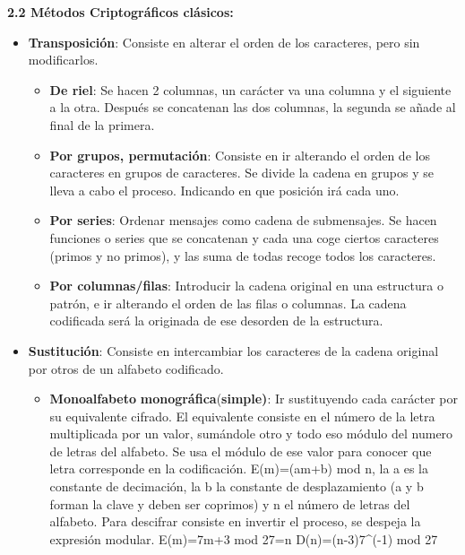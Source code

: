 \documentclass[12pt, twoside, openright]{report} %
\begin{document}
  \pagebreak
  \textbf{2.2 Métodos Criptográficos clásicos:}
  

  \begin{itemize}
  \item \textbf{Transposición}: Consiste en alterar el orden de los
    caracteres, pero sin modificarlos.
    

    \begin{itemize}
    \item \textbf{De riel}: Se hacen 2 columnas, un carácter va una columna
      y el siguiente a la otra. Después se concatenan las dos columnas,
      la segunda se añade al final de la primera.
      
    \item \textbf{Por grupos, permutación}: Consiste en ir alterando el
      orden de los caracteres en grupos de caracteres. Se divide la
      cadena en grupos y se lleva a cabo el proceso. Indicando en que
      posición irá cada uno.
      
    \item \textbf{Por series}: Ordenar mensajes como cadena de submensajes.
      Se hacen funciones o series que se concatenan y cada una coge
      ciertos caracteres (primos y no primos), y las suma de todas
      recoge todos los caracteres.
      
    \item \textbf{Por columnas/filas}: Introducir la cadena original en una
      estructura o patrón, e ir alterando el orden de las filas o
      columnas. La cadena codificada será la originada de ese desorden
      de la estructura.
      
    \end{itemize}
  \item \textbf{Sustitución}: Consiste en intercambiar los caracteres de la
    cadena original por otros de un alfabeto codificado.
    

    \begin{itemize}
    \item \textbf{Monoalfabeto} \textbf{monográfica}(\textbf{simple)}: Ir
      sustituyendo cada carácter por su equivalente cifrado. El
      equivalente consiste en el número de la letra multiplicada por un
      valor, sumándole otro y todo eso módulo del numero de letras del
      alfabeto. Se usa el módulo de ese valor para conocer que letra
      corresponde en la codificación. E(m)=(am+b) mod n, la a es la
      constante de decimación, la b la constante de desplazamiento (a y
      b forman la clave y deben ser coprimos) y n el número de letras
      del alfabeto. Para descifrar consiste en invertir el proceso, se
      despeja la expresión modular. E(m)=7m+3 mod 27=n
      D(n)=(n-3)7\^{}(-1) mod 27
      


\end{itemize}
\end{itemize}
\end{document}
